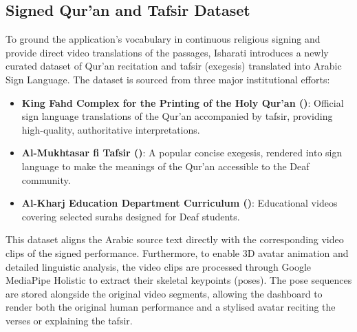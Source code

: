 \subsection{Signed Qur'an and Tafsir Dataset}
\label{sec:tafsirdataset}
To ground the application's vocabulary in continuous religious signing and provide direct video translations of the passages, Isharati introduces a newly curated dataset of Qur'an recitation and tafsir (exegesis) translated into Arabic Sign Language. The dataset is sourced from three major institutional efforts:
\begin{itemize}[leftmargin=*,itemsep=1pt]
  \item \textbf{King Fahd Complex for the Printing of the Holy Qur'an ()}: Official sign language translations of the Qur'an accompanied by tafsir, providing high-quality, authoritative interpretations.
  \item \textbf{Al-Mukhtasar fi Tafsir ()}: A popular concise exegesis, rendered into sign language to make the meanings of the Qur'an accessible to the Deaf community.
  \item \textbf{Al-Kharj Education Department Curriculum ()}: Educational videos covering selected surahs designed for Deaf students.
\end{itemize}
This dataset aligns the Arabic source text directly with the corresponding video clips of the signed performance. Furthermore, to enable 3D avatar animation and detailed linguistic analysis, the video clips are processed through Google MediaPipe Holistic to extract their skeletal keypoints (poses). The pose sequences are stored alongside the original video segments, allowing the dashboard to render both the original human performance and a stylised avatar reciting the verses or explaining the tafsir.


